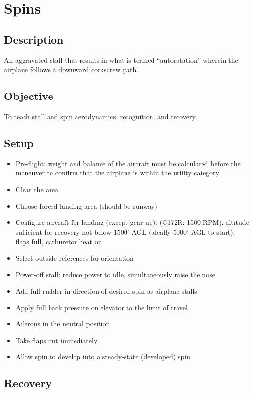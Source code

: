 \section{Spins}

\subsection{Description}

An aggravated stall that results in what is termed ``autorotation'' wherein the
airplane follows a downward corkscrew path.

\subsection{Objective}

To teach stall and spin aerodynamics, recognition, and recovery.

\subsection{Setup}

\begin{itemize}
  \item Pre-flight: weight and balance of the aircraft must be calculated
    before the maneuver to confirm that the airplane is within the utility
    category
  \item Clear the area
  \item Choose forced landing area (should be runway)
  \item Configure aircraft for landing (except gear up): (C172R: 1500 RPM),
    altitude sufficient for recovery not below 1500' AGL (ideally 5000' AGL to
    start), flaps full, carburetor heat on
  \item Select outside references for orientation
  \item Power-off stall: reduce power to idle, simultaneously raise the nose
  \item Add full rudder in direction of desired spin as airplane stalls
  \item Apply full back pressure on elevator to the limit of travel
  \item Ailerons in the neutral position
  \item Take flaps out immediately 
  \item Allow spin to develop into a steady-state (developed) spin
\end{itemize}

\subsection{Recovery}

